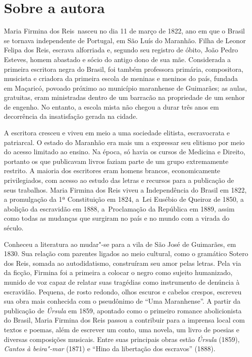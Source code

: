 
\section{Sobre a autora}

\noindent{}Maria Firmina dos Reis~nasceu no dia 11 de março de 1822, ano
em que o Brasil se tornava independente de Portugal, em São Luís do
Maranhão. Filha de Leonor Felipa dos Reis, escrava alforriada e, segundo
seu registro de óbito, João Pedro Esteves, homem abastado e sócio do
antigo dono de sua mãe. Considerada a primeira escritora negra do
Brasil, foi também professora primária, compositora, musicista e
criadora da primeira escola de meninas e meninos do país, fundada em
Maçaricó, povoado próximo ao município maranhense de Guimarães; as
aulas, gratuitas, eram ministradas dentro de um barracão na propriedade
de um senhor de engenho. No entanto, a escola mista não chegou a durar
três anos em decorrência da insatisfação gerada na cidade.

A escritora cresceu e viveu em meio a uma
sociedade elitista, escravocrata e patriarcal. O estado do Maranhão era
mais um a expressar seu elitismo por meio do acesso limitado ao ensino.
Na época, só havia os cursos de Medicina e Direito, portanto os que
publicavam livros faziam parte de um grupo extremamente restrito. A
maioria dos escritores eram homens brancos, economicamente
privilegiados, com acesso ao estudo das letras e recursos para a
publicação de seus trabalhos. Maria Firmina dos Reis viveu a
Independência do Brasil em 1822, a promulgação da 1ª Constituição em
1824, a~Lei Eusébio de Queiroz de 1850, a abolição da escravidão em
1888, a~Proclamação da República em 1889, assim como todas as mudanças
que surgiram no país e no mundo com a virada do século.

Conheceu a literatura ao mudar"-se para a vila de São José
de Guimarães, em 1830. Sua relação com parentes ligados ao meio
cultural, como o gramático Sotero dos Reis, somada ao autodidatismo,
construíram seu amor pelas letras. Pela via da ficção, Firmina foi a
primeira a colocar o negro como sujeito humanizado, munido de voz capaz
de relatar suas tragédias como instrumento de denúncia à escravidão.
Pequena, de rosto redondo, olhos escuros e cabelos crespos, escreveu sua
obra mais conhecida com o pseudônimo de ``Uma Maranhense''. A partir da
publicação de \emph{Úrsula} em 1859, apontado como o primeiro romance
abolicionista do Brasil, Maria Firmina dos Reis passou a contribuir para
a imprensa local com textos e poemas, além de escrever um conto, uma
novela, um livro de poesias e diversas composições musicais. Entre suas
principais obras estão \emph{Úrsula} (1859), \emph{Cantos à beira"-mar}
(1871) e ``Hino da libertação dos escravos'' (1888).

